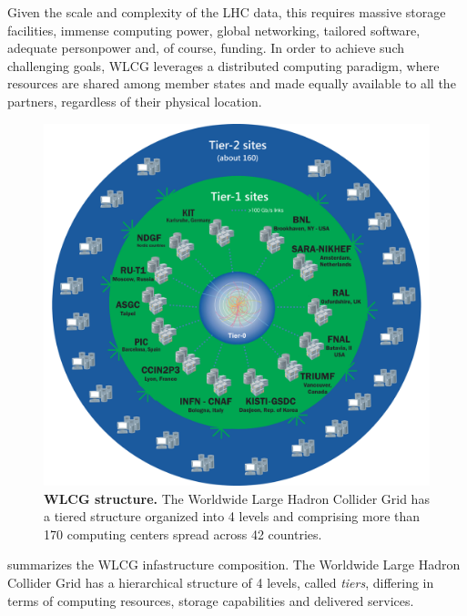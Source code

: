 Given the scale and complexity of the LHC data, this requires massive storage facilities, immense computing power, global networking, tailored software, adequate personpower and, of course, funding.
In order to achieve such challenging goals, WLCG leverages a distributed computing paradigm, where resources are shared among member states and made equally available to all the partners, regardless of their physical location.
\begin{figure}
    \centering
    \includegraphics[width=\textwidth]{figures/220_introduction/WLCG-Tiers-2021_v3.png}
    \caption{\textbf{WLCG structure.} The Worldwide Large Hadron Collider Grid has a tiered structure organized into 4 levels and comprising more than 170 computing centers spread across 42 countries.
    } \label{fig:wlcg}
\end{figure}
 summarizes the WLCG infastructure composition. 
The Worldwide Large Hadron Collider Grid has a hierarchical structure of 4 levels, called \textit{tiers}, differing in terms of computing resources, storage capabilities and delivered services. 
